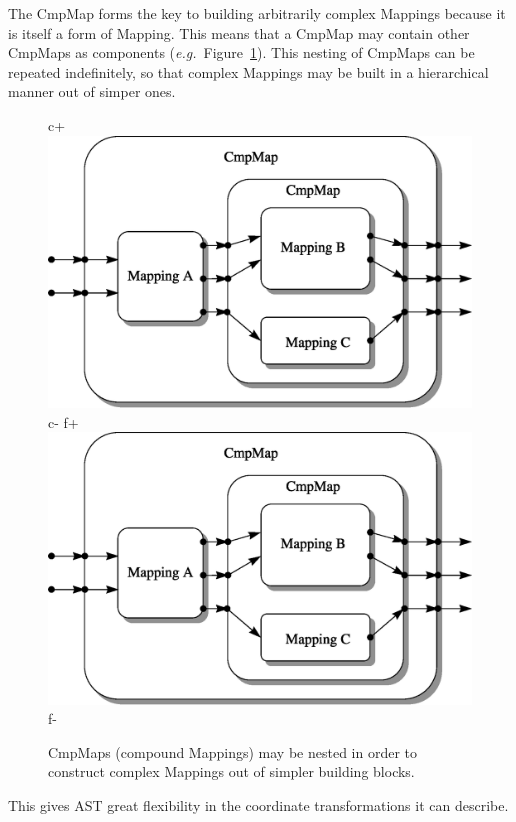 \documentclass[twoside,11pt]{article}
\newenvironment{latexonly}{}{}
\begin{document}
\begin{latexonly}
   The CmpMap forms the key to building arbitrarily complex Mappings
   because it is itself a form of Mapping. This means that a CmpMap may
   contain other CmpMaps as components
   ({\em{e.g.}}\ Figure~\ref{fig:complexcmpmap}). This nesting of CmpMaps
   can be repeated indefinitely, so that complex Mappings may be built in
   a hierarchical manner out of simper ones.
   \begin{figure}
   \begin{center}
c+
   \includegraphics[scale=0.6]{sun211_figures/complex.eps}
c-
f+
   \includegraphics[scale=0.6]{sun210_figures/complex.eps}
f-
   \caption{CmpMaps (compound Mappings) may be nested in order to
   construct complex Mappings out of simpler building blocks.}
   \label{fig:complexcmpmap}
   \end{center}
   \end{figure}
   This gives AST great flexibility in the coordinate transformations it
   can describe.
\end{latexonly}
\end{document}
